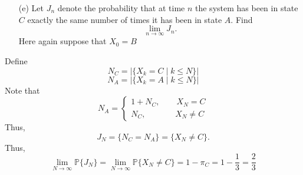 \documentclass[11pt]{article}
\newcommand{\bbP}{\mathbb{P}}
\begin{document}
\begin{problem}
\begin{enumerate}
\begin{solution}
\end{solution}
    \item[(e)] Let \( J_n \) denote the probability that at time \( n \) the system has been in state \( C \) exactly the same number of times it has been in state \( A \). Find
    \[
    \lim_{n \to \infty} J_n.
    \] Here again suppose that $X_0 = B$
\end{enumerate}
\begin{solution}


Define 
\[N_C = |\{X_k = C \mid k\leq N\}|\]
\[N_A = |\{X_k = A\mid k\leq N\}|\] Note that 
\[N_A = \begin{cases}
    1 + N_C, \qquad X_N = C\\
    N_C, \quad \;\;\qquad X_N \neq C
\end{cases}\]
Thus, 
\[J_N = \{N_C = N_A\} = \{X_N \neq C\}.\] Thus, 
\[\lim_{N\to \infty}\bbP\{J_N\} = \lim_{N\to \infty}\bbP\{X_N \neq C\}= 1-\pi_C = 1- \frac{1}{3} = \boxed{\frac{2}{3}}\]
\end{solution}
\end{problem}

\newpage
\end{document}
